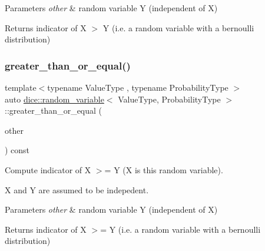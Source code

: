 \begin{DoxyParams}{Parameters}
{\em other} & random variable Y (independent of X)\\
\hline
\end{DoxyParams}
\begin{DoxyReturn}{Returns}
indicator of X $>$ Y (i.\+e. a random variable with a bernoulli distribution) 
\end{DoxyReturn}
\mbox{\label{classdice_1_1random__variable_a067075bcd32f952f4eadcd7a888038b5}} 
\subsubsection{\texorpdfstring{greater\+\_\+than\+\_\+or\+\_\+equal()}{greater\_than\_or\_equal()}}
{\footnotesize\ttfamily template$<$typename Value\+Type , typename Probability\+Type $>$ \\
auto \mbox{\hyperlink{classdice_1_1random__variable}{dice\+::random\+\_\+variable}}$<$ Value\+Type, Probability\+Type $>$\+::greater\+\_\+than\+\_\+or\+\_\+equal (\begin{DoxyParamCaption}\item[{const \mbox{\hyperlink{classdice_1_1random__variable}{random\+\_\+variable}}$<$ Value\+Type, Probability\+Type $>$ \&}]{other }\end{DoxyParamCaption}) const\hspace{0.3cm}{\ttfamily [inline]}}



Compute indicator of X $>$= Y (X is this random variable). 

X and Y are assumed to be indepedent.


\begin{DoxyParams}{Parameters}
{\em other} & random variable Y (independent of X)\\
\hline
\end{DoxyParams}
\begin{DoxyReturn}{Returns}
indicator of X $>$= Y (i.\+e. a random variable with a bernoulli distribution) 
\end{DoxyReturn}
\mbox{\label{classdice_1_1random__variable_a20c851091e966593c053252fb76f390e}} 
